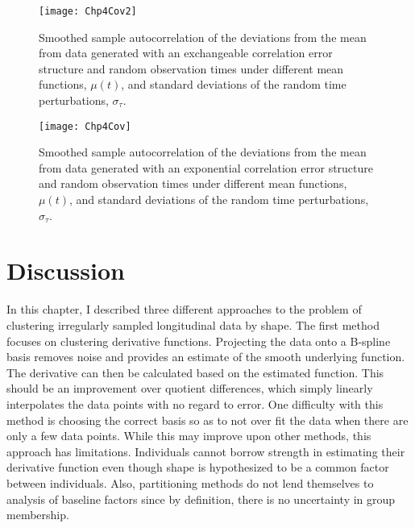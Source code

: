 \begin{landscape}
\begin{figure}
\begin{center}
\texttt{[image: Chp4Cov2]}
\end{center}
\caption{Smoothed sample autocorrelation of the deviations from the mean from data generated with an exchangeable correlation error structure and random observation times under different mean functions, $\mu(t)$, and standard deviations of the random time perturbations, $\sigma_{\tau}$.}
\label{fig:cov1}
\end{figure}

\begin{figure}
\begin{center}
\texttt{[image: Chp4Cov]}
\end{center}
\caption{Smoothed sample autocorrelation of the deviations from the mean from data generated with an exponential correlation error structure and random observation times under different mean functions, $\mu(t)$, and standard deviations of the random time perturbations, $\sigma_{\tau}$.}
\label{fig:cov}
\end{figure}
\end{landscape}



\section{Discussion}
In this chapter, I described three different approaches to the problem of clustering irregularly sampled longitudinal data by shape. The first method focuses on clustering derivative functions. Projecting the data onto a B-spline basis removes noise and provides an estimate of the smooth underlying function. The derivative can then be calculated based on the estimated function. This should be an improvement over quotient differences, which simply linearly interpolates the data points with no regard to error. One difficulty with this method is choosing the correct basis so as to not over fit the data when there are only a few data points. While this may improve upon other methods, this approach has limitations. Individuals cannot borrow strength in estimating their derivative function even though shape is hypothesized to be a common factor between individuals. Also, partitioning methods do not lend themselves to analysis of baseline factors since by definition, there is no uncertainty in group membership.  

